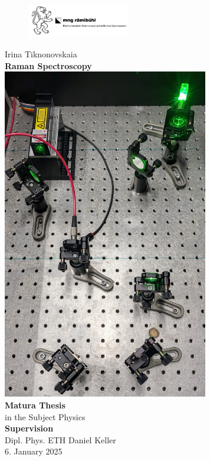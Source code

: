\documentclass[a4paper]{article}
\date{November 2024}
\begin{document}

\begin{figure}
    \includegraphics[width=0.4\textwidth]{images/MNG_pic.png}
\end{figure}
\begin{center}
    \large
    Irina Tiknonovskaia\\
    \Huge \textbf{Raman Spectroscopy}
    \\[0.5cm]
    \includegraphics[width=9cm]{images/active_setup_photo.jpg}
    \\[0.5cm]
    \large
    \textbf{Matura Thesis}\\
    in the Subject Physics
    \\[0.25cm]
    \textbf{Supervision}\\
    Dipl. Phys. ETH Daniel Keller
    \\[0.25cm]
    6. January 2025
\end{center}
\newpage
{}
\end{document}
